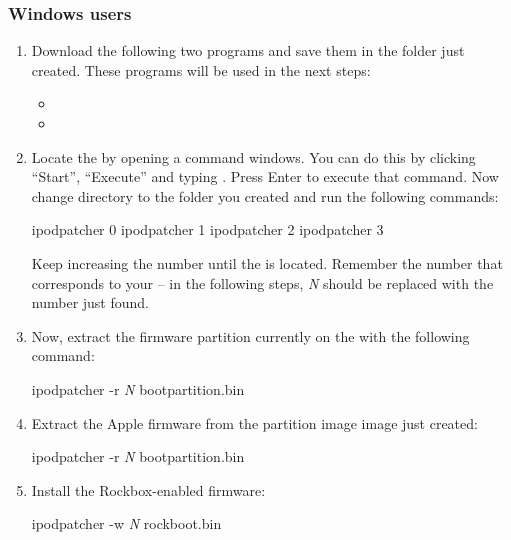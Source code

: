 \subsubsection{Windows users}
\begin{enumerate}
  \item Download the following two programs and save them in the folder just
    created. These programs will be used in the next steps:
    \begin{itemize}
      \item {}
      \item {}
    \end{itemize}
  \item Locate the \dap{} by opening a command windows. You can do this by
    clicking ``Start'', ``Execute'' and typing . Press Enter to
    execute that command. Now change directory to the
    folder you created and run the following commands:
    \begin{code}
    ipodpatcher 0
    ipodpatcher 1
    ipodpatcher 2
    ipodpatcher 3
    \end{code}
    Keep increasing the number until the \dap{} is located.  Remember the number that corresponds to your \dap{} -- in the 
    following steps, \emph{N} should be replaced with the number just found.
  \item Now, extract the firmware partition currently on the \dap{} with the
    following command:
    \begin{code}
    ipodpatcher -r \emph{N} bootpartition.bin
    \end{code}
  \item Extract the Apple firmware from the partition image image just created:
    \begin{code}
    ipodpatcher -r \emph{N} bootpartition.bin
    \end{code}
  \item
    Install the Rockbox-enabled firmware:
    \begin{code}
    ipodpatcher -w \emph{N} rockboot.bin
    \end{code}
\end{enumerate}

